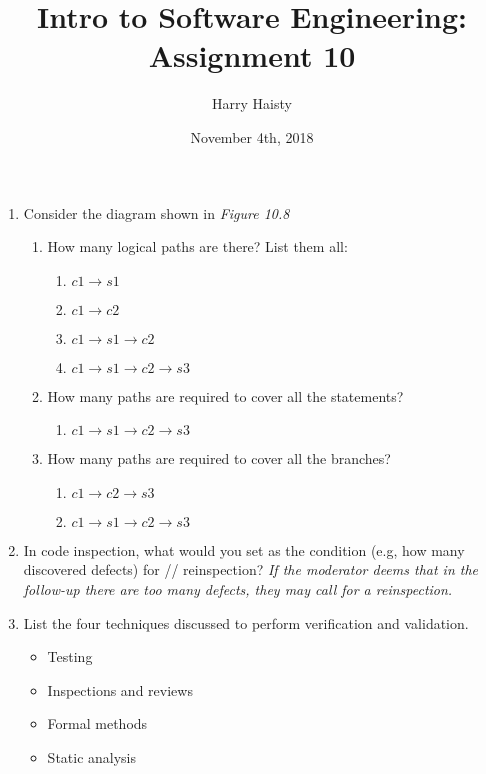\documentclass[11pt]{article}
\date{November 4th, 2018}
\title{Intro to Software Engineering: Assignment 10}
\author{Harry Haisty}
\begin{document}
    \maketitle
    \begin{enumerate}
        \item Consider the diagram shown in \textit{Figure 10.8}
        \begin{enumerate}
        \item How many logical paths are there? List them all:
        \begin{enumerate}
            \item $c1 \rightarrow s1$
            \item $c1 \rightarrow c2$
            \item $c1 \rightarrow s1 \rightarrow c2$
            \item $c1 \rightarrow s1 \rightarrow c2 \rightarrow s3$
        \end{enumerate}
        
        \item How many paths are required to cover all the statements?
        \begin{enumerate}
            \item $c1 \rightarrow s1 \rightarrow c2 \rightarrow s3$
        \end{enumerate}
        
        \item How many paths are required to cover all the branches?
        \begin{enumerate}
            \item $c1 \rightarrow c2 \rightarrow s3$
            \item $c1 \rightarrow s1 \rightarrow c2 \rightarrow s3$
        \end{enumerate}
        
        \end{enumerate}
        
        \item In code inspection, what would you set as the condition (e.g, how many discovered defects) for // reinspection?
        \newline 
       \textit{If the moderator deems that in the follow-up there are too many defects, they may call for a reinspection.}
        
        \item List the four techniques discussed to perform verification and validation.
        \begin{itemize}
            \item Testing
            \item Inspections and reviews
            \item Formal methods
            \item Static analysis
        \end{itemize}
        

\end{enumerate}
\end{document}
